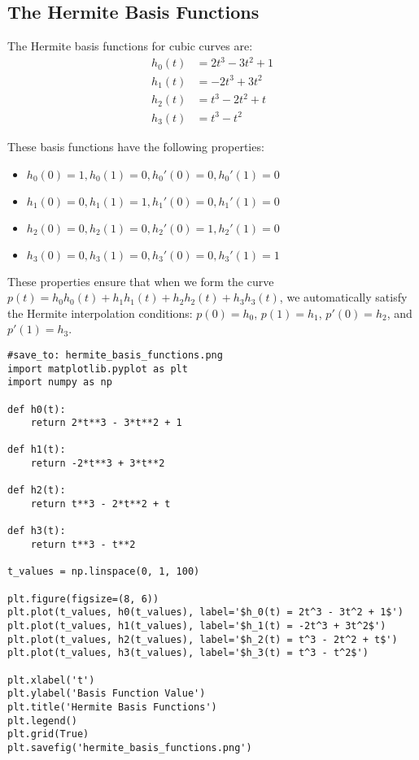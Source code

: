 \documentclass{article}
\begin{document}
\subsection{The Hermite Basis Functions}

The Hermite basis functions for cubic curves are:
\begin{align*}
h_0(t) &= 2t^3 - 3t^2 + 1 \\
h_1(t) &= -2t^3 + 3t^2 \\
h_2(t) &= t^3 - 2t^2 + t \\
h_3(t) &= t^3 - t^2
\end{align*}

These basis functions have the following properties:

\begin{itemize}
    \item \(h_0(0) = 1, h_0(1) = 0, h_0'(0) = 0, h_0'(1) = 0\)
    \item \(h_1(0) = 0, h_1(1) = 1, h_1'(0) = 0, h_1'(1) = 0\)
    \item \(h_2(0) = 0, h_2(1) = 0, h_2'(0) = 1, h_2'(1) = 0\)
    \item \(h_3(0) = 0, h_3(1) = 0, h_3'(0) = 0, h_3'(1) = 1\)
\end{itemize}

These properties ensure that when we form the curve \(p(t) = h_0 h_0(t) + h_1 h_1(t) + h_2 h_2(t) + h_3 h_3(t)\), we automatically satisfy the Hermite interpolation conditions: \(p(0) = h_0\), \(p(1) = h_1\), \(p'(0) = h_2\), and \(p'(1) = h_3\).

\begin{verbatim}
#save_to: hermite_basis_functions.png
import matplotlib.pyplot as plt
import numpy as np

def h0(t):
    return 2*t**3 - 3*t**2 + 1

def h1(t):
    return -2*t**3 + 3*t**2

def h2(t):
    return t**3 - 2*t**2 + t

def h3(t):
    return t**3 - t**2

t_values = np.linspace(0, 1, 100)

plt.figure(figsize=(8, 6))
plt.plot(t_values, h0(t_values), label='$h_0(t) = 2t^3 - 3t^2 + 1$')
plt.plot(t_values, h1(t_values), label='$h_1(t) = -2t^3 + 3t^2$')
plt.plot(t_values, h2(t_values), label='$h_2(t) = t^3 - 2t^2 + t$')
plt.plot(t_values, h3(t_values), label='$h_3(t) = t^3 - t^2$')

plt.xlabel('t')
plt.ylabel('Basis Function Value')
plt.title('Hermite Basis Functions')
plt.legend()
plt.grid(True)
plt.savefig('hermite_basis_functions.png')
\end{verbatim}
\end{document}

